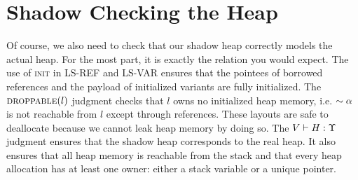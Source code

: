 \section*{Shadow Checking the Heap}
Of course, we also need to check that our shadow heap correctly models
the actual heap. For the most part, it is exactly the relation you would expect.
The use of \textsc{init} in \textsc{LS-REF} and \textsc{LS-VAR} ensures that
the pointees of borrowed references and the payload of initialized variants
are fully initialized.
The $\textsc{droppable}(l)$ judgment checks that $l$ owns no initialized heap memory,
i.e. $\sim{\alpha}$ is not reachable from $l$ except through references.
These layouts are safe to deallocate because we cannot leak heap memory by doing so.
The ${V} \vdash {H} : {\Upsilon}$ judgment ensures that the shadow heap corresponds to the real heap.
It also ensures that all heap memory is reachable from the stack and that
every heap allocation has at least one owner: either a stack variable or a unique pointer.
\newline





